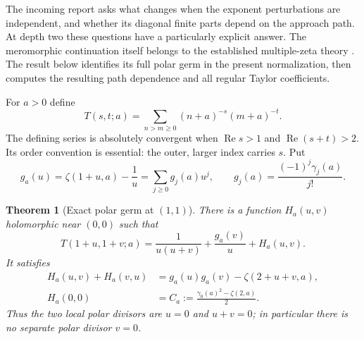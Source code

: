 \documentclass[11pt,letterpaper]{article}
\numberwithin{equation}{section}
\theoremstyle{plain}
\newtheorem{theorem}{Theorem}[section]
\theoremstyle{definition}
\theoremstyle{remark}
\DeclareMathOperator{\Rea}{Re}
\begin{document}
The incoming report asks what changes when the exponent perturbations
are independent, and whether its diagonal finite parts depend on the
approach path. At depth two these questions have a particularly explicit
answer. The meromorphic continuation itself belongs to the established
multiple-zeta theory \cite{mow}. The result below identifies its full
polar germ in the present normalization, then computes the resulting
path dependence and all regular Taylor coefficients.

For $a>0$ define
\begin{equation}\label{eq:doublehurwitz}
 T(s,t;a)=\sum_{n>m\ge0}(n+a)^{-s}(m+a)^{-t}.
\end{equation}
The defining series is absolutely convergent when
$\Rea s>1$ and $\Rea(s+t)>2$. Its order convention is essential: the
outer, larger index carries $s$. Put
\[
 g_a(u)=\zeta(1+u,a)-\frac1u
       =\sum_{j\ge0}g_j(a)u^j,
 \qquad g_j(a)=\frac{(-1)^j\gamma_j(a)}{j!}.
\]

\begin{theorem}[Exact polar germ at $(1,1)$]\label{thm:doublegerm}
There is a function $H_a(u,v)$ holomorphic near $(0,0)$ such that
\begin{equation}\label{eq:doublegerm}
 \boxed{T(1+u,1+v;a)
   =\frac1{u(u+v)}+\frac{g_a(v)}u+H_a(u,v).}
\end{equation}
It satisfies
\begin{align}
 H_a(u,v)+H_a(v,u)
   &=g_a(u)g_a(v)-\zeta(2+u+v,a),\label{eq:Hsym}\\
 H_a(0,0)&=C_a:=\frac{\gamma_0(a)^2-\zeta(2,a)}2.
 \label{eq:H00}
\end{align}
Thus the two local polar divisors are $u=0$ and $u+v=0$; in particular
there is no separate polar divisor $v=0$.
\end{theorem}
\end{document}
